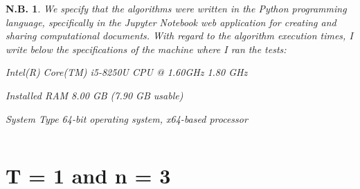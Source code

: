 \documentclass[a4paper,11pt,openright]{report}
\newtheorem{notabene}[teo]{N.B.}
\begin{document}
\begin{notabene}
We specify that the algorithms were written in the Python programming language, specifically in the Jupyter Notebook web application for creating and sharing computational documents. With regard to the algorithm execution times, I write below the specifications of the machine where I ran the tests:

Intel(R) Core(TM) i5-8250U CPU @ 1.60GHz 1.80 GHz 

Installed RAM 8.00 GB (7.90 GB usable) 


System Type 64-bit operating system, x64-based processor
\end{notabene}
\[
\]
\newpage
\section{T = 1 and n = 3}
\end{document}
